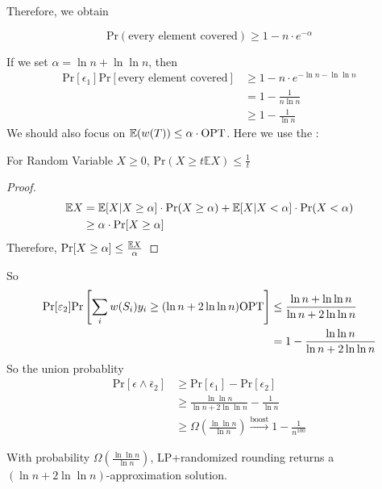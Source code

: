 
Therefore, we obtain 
\begin{claim}
    \[\mathrm{Pr}(\text{every element covered}) \geq 1-n\cdot e^{-\alpha}\]
\end{claim}
If we set  $ \alpha=\ln n+\ln\ln n $, then 
\begin{align*}
    \mathrm{Pr}[\epsilon_1]\mathrm{Pr}[\text{every element covered}]&\geq 1-n\cdot e^{-\ln n-\ln\ln n}\\
    &=1-\frac{1}{n\ln n}\\
    &\geq 1-\frac{1}{\ln n}
\end{align*} 
We should also focus on  $ \mathbb E(w(T)) \leq \alpha\cdot\mathrm{OPT} $. Here we use the :
\begin{theorem}
    For Random Variable  $ X \geq 0 $,  $ \mathrm{Pr}(X \geq t\mathbb EX) \leq \frac{1}{t} $  
\end{theorem} 
\begin{proof}
    \begin{align*}
        \mathbb E X&=\mathbb E[X|X \geq \alpha]\cdot \mathrm{Pr}(X \geq \alpha)+ \mathbb E[X|X < \alpha]\cdot \mathrm{Pr}(X < \alpha)\\
        & \geq \alpha\cdot\mathrm{Pr}[X \geq \alpha]
    \end{align*}
    Therefore,  $ \mathrm{Pr}[X \geq \alpha] \leq \frac{\mathbb E X}{\alpha} $ 
\end{proof}
So 
\begin{align*}
    \mathrm{Pr}[\varepsilon_2]\mathrm{Pr}\left[\sum_{i}w(S_i)y_i\geq (\ln n+2\ln\ln n)\mathrm{OPT}\right]& \leq \frac{\ln n+\ln\ln n}{\ln n+2\ln \ln n} \\
    &=1-\frac{\ln \ln n}{\ln n+2\ln\ln n}
\end{align*}
So the union probablity 
\[\begin{aligned}
    \mathrm{Pr}[\epsilon\wedge \bar{\epsilon}_2]& \geq \mathrm{Pr}[\epsilon_1]-\mathrm{Pr}[\epsilon_2]\\
    & \geq \frac{\ln\ln n}{\ln n+2\ln\ln n}-\frac{1}{\ln n}\\
    & \geq \Omega(\frac{\ln\ln n}{\ln n})\xrightarrow{\text{boost}}1-\frac{1}{n^{100}}
\end{aligned}\]

\begin{theorem}
    With probability  $ \Omega(\frac{\ln\ln n}{\ln n}) $, LP+randomized rounding returns a  $ (\ln n+2\ln \ln n) $-approximation solution.  
\end{theorem}

